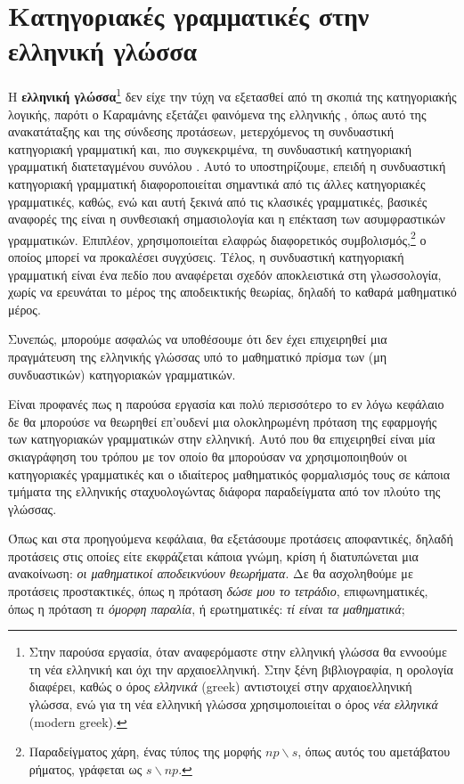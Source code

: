 \documentclass [a4paper,11pt] {book}
\theoremstyle{definition}
\theoremstyle{definition}
\begin{document}
\chapter{Κατηγοριακές γραμματικές στην ελληνική γλώσσα}
Η \textbf{ελληνική γλώσσα}\footnote{Στην παρούσα εργασία, όταν αναφερόμαστε στην ελληνική γλώσσα θα εννοούμε τη νέα ελληνική και όχι την αρχαιοελληνική. Στην ξένη βιβλιογραφία, η ορολογία διαφέρει, καθώς ο όρος \textit{ελληνικά} (greek) αντιστοιχεί στην αρχαιοελληνική γλώσσα, ενώ για τη νέα ελληνική γλώσσα χρησιμοποιείται ο όρος \textit{νέα ελληνικά} (modern greek).} δεν είχε την τύχη να εξετασθεί από τη σκοπιά της κατηγοριακής λογικής, παρότι ο Καραμάνης εξετάζει φαινόμενα της ελληνικής \citep{Karamanisacategorial}, όπως αυτό της ανακατάταξης και της σύνδεσης προτάσεων, μετερχόμενος τη συνδυαστική κατηγοριακή γραμματική και, πιο συγκεκριμένα, τη συνδυαστική κατηγοριακή γραμματική διατεταγμένου συνόλου \citep{Karamanisorderedset}. Αυτό το υποστηρίζουμε, επειδή η συνδυαστική κατηγοριακή γραμματική \citep{Stee:03d} διαφοροποιείται σημαντικά από τις άλλες κατηγοριακές γραμματικές, καθώς, ενώ και αυτή ξεκινά από τις κλασικές γραμματικές, βασικές αναφορές της είναι η συνθεσιακή σημασιολογία και η επέκταση των ασυμφραστικών γραμματικών. Επιπλέον, χρησιμοποιείται ελαφρώς διαφορετικός συμβολισμός,\footnote{Παραδείγματος χάρη, ένας τύπος της μορφής $np\backslash s$, όπως αυτός του αμετάβατου ρήματος, γράφεται ως $s\backslash np$.} ο οποίος μπορεί να προκαλέσει συγχύσεις. Τέλος, η συνδυαστική κατηγοριακή γραμματική είναι ένα πεδίο που αναφέρεται σχεδόν αποκλειστικά στη γλωσσολογία, χωρίς να ερευνάται το μέρος της αποδεικτικής θεωρίας, δηλαδή το καθαρά μαθηματικό μέρος.
 
Συνεπώς, μπορούμε ασφαλώς να υποθέσουμε ότι δεν έχει επιχειρηθεί μια πραγμάτευση της ελληνικής γλώσσας υπό το μαθηματικό πρίσμα των (μη συνδυαστικών) κατηγοριακών γραμματικών.

Είναι προφανές πως η παρούσα εργασία και πολύ περισσότερο το εν λόγω κεφάλαιο δε θα μπορούσε να θεωρηθεί επ'ουδενί μια ολοκληρωμένη πρόταση της εφαρμογής των κατηγοριακών γραμματικών στην ελληνική. Αυτό που θα επιχειρηθεί είναι μία σκιαγράφηση του τρόπου με τον οποίο θα μπορούσαν να χρησιμοποιηθούν οι κατηγοριακές γραμματικές και ο ιδιαίτερος μαθηματικός φορμαλισμός τους σε κάποια τμήματα της ελληνικής σταχυολογώντας διάφορα παραδείγματα από τον πλούτο της γλώσσας.

Όπως και στα προηγούμενα κεφάλαια, θα εξετάσουμε προτάσεις αποφαντικές, δηλαδή προτάσεις στις οποίες είτε εκφράζεται κάποια γνώμη, κρίση ή διατυπώνεται μια ανακοίνωση: \textit{οι μαθηματικοί αποδεικνύουν θεωρήματα}. Δε θα ασχοληθούμε με προτάσεις προστακτικές, όπως η πρόταση \textit{δώσε μου το τετράδιο}, επιφωνηματικές, όπως η πρόταση \textit{τι όμορφη παραλία}, ή ερωτηματικές: \textit{τί είναι τα μαθηματικά};
\end{document}
